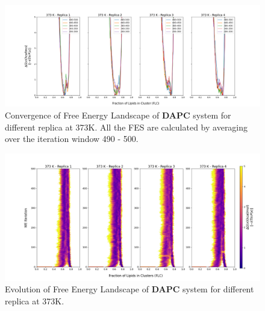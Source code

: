 \documentclass{biophys-new}
\begin{document}
\begin{figure}[hbt!]
\centering
\includegraphics[width=1.1\linewidth]{all_plots/ClusterLipids2Total/DPPC_DAPC_CHOL/373K/Convergence_DAPC_373_ClusterLipids2Total.png}
\caption{Convergence of Free Energy Landscape of \textbf{DAPC} system for different replica at 373K. All the FES are calculated by averaging over the iteration window 490 - 500.}
\label{fig:view}

\end{figure}

\begin{figure}[hbt!]
\centering
\includegraphics[width=1.1\linewidth]{all_plots/ClusterLipids2Total/DPPC_DAPC_CHOL/373K/Evolution_DAPC_373_ClusterLipids2Total.png}
\caption{Evolution of Free Energy Landscape of \textbf{DAPC} system for different replica at 373K.}
\label{fig:view}

\end{figure}
\end{document}
